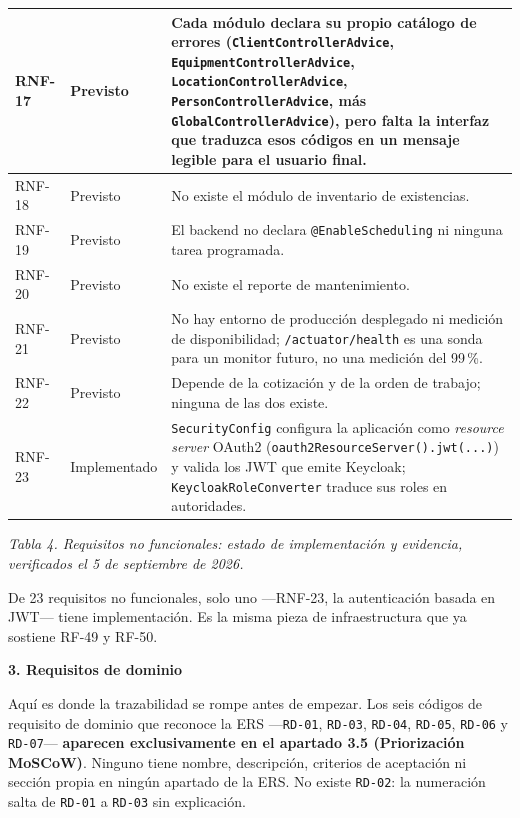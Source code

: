 \documentclass[12pt,varwidth=170mm,border=10pt]{standalone}
\newcommand{\sectiontitle}[1]{%
  \par\vspace{1.8ex}%
  {\normalfont\Large\bfseries #1\par}%
  \vspace{1.0ex}%
}
\newcommand{\ruta}[1]{\nolinkurl{#1}}
\newcommand{\tablecaption}[2]{%
  \par\vspace{0.4em}%
  \begin{center}
    \footnotesize\textit{Tabla #1. #2}
  \end{center}
  \vspace{1.0em}%
}
\begin{document}
\begin{center}
\begin{tabular}{|p{1.5cm}|p{2.4cm}|p{10.1cm}|}
\hline
RNF-17 & Previsto & Cada módulo declara su propio catálogo de errores (\texttt{ClientControllerAdvice}, \texttt{EquipmentControllerAdvice}, \texttt{LocationControllerAdvice}, \texttt{PersonControllerAdvice}, más \texttt{GlobalControllerAdvice}), pero falta la interfaz que traduzca esos códigos en un mensaje legible para el usuario final. \\
\hline
RNF-18 & Previsto & No existe el módulo de inventario de existencias. \\
\hline
RNF-19 & Previsto & El backend no declara \texttt{@EnableScheduling} ni ninguna tarea programada. \\
\hline
RNF-20 & Previsto & No existe el reporte de mantenimiento. \\
\hline
RNF-21 & Previsto & No hay entorno de producción desplegado ni medición de disponibilidad; \ruta{/actuator/health} es una sonda para un monitor futuro, no una medición del 99\,\%. \\
\hline
RNF-22 & Previsto & Depende de la cotización y de la orden de trabajo; ninguna de las dos existe. \\
\hline
RNF-23 & Implementado & \texttt{SecurityConfig} configura la aplicación como \emph{resource server} OAuth2 (\texttt{oauth2ResourceServer().jwt(...)}) y valida los JWT que emite Keycloak; \texttt{KeycloakRoleConverter} traduce sus roles en autoridades. \\
\hline
\end{tabular}
\end{center}
\tablecaption{4}{Requisitos no funcionales: estado de implementación y evidencia, verificados el 5 de septiembre de 2026.}
\endgroup

De 23 requisitos no funcionales, solo uno —RNF-23, la autenticación basada en JWT— tiene implementación. Es la misma pieza de infraestructura que ya sostiene RF-49 y RF-50.

\sectiontitle{3. Requisitos de dominio}

Aquí es donde la trazabilidad se rompe antes de empezar. Los seis códigos de requisito de dominio que reconoce la ERS —\texttt{RD-01}, \texttt{RD-03}, \texttt{RD-04}, \texttt{RD-05}, \texttt{RD-06} y \texttt{RD-07}— \textbf{aparecen exclusivamente en el apartado 3.5 (Priorización MoSCoW)}. Ninguno tiene nombre, descripción, criterios de aceptación ni sección propia en ningún apartado de la ERS. No existe \texttt{RD-02}: la numeración salta de \texttt{RD-01} a \texttt{RD-03} sin explicación.
\end{document}
